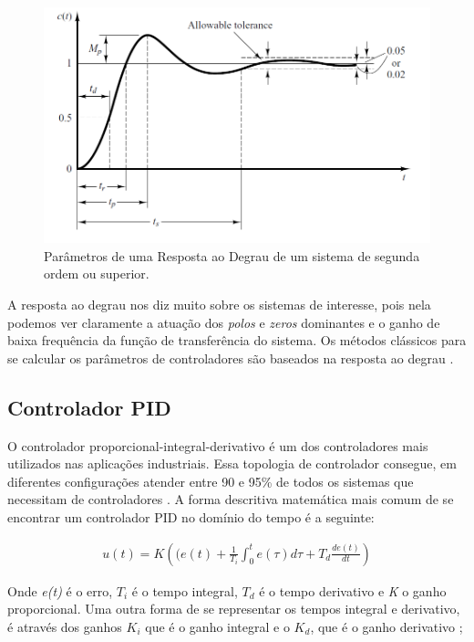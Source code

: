 \begin{figure}[!ht]
  \caption{Parâmetros de uma Resposta ao Degrau de um sistema de segunda ordem ou superior.}
  \begin{center}
      \includegraphics[scale=0.5]{img/transient_ogata_p170}
  \end{center}
  \label{fig:transient_ogata_p170}
\end{figure}

A resposta ao degrau nos diz muito sobre os sistemas de interesse, pois nela podemos ver claramente a atuação dos \textit{polos} e \textit{zeros} dominantes e o ganho de baixa frequência da função de transferência do sistema. Os métodos clássicos para se calcular os parâmetros de controladores são baseados na resposta ao degrau \cite{Ogata}. 

\subsection{Controlador PID}

O controlador proporcional-integral-derivativo é um dos controladores mais utilizados nas aplicações industriais. Essa topologia de controlador consegue, em diferentes configurações atender entre 90 e 95\% de todos os sistemas que necessitam de controladores \cite{Levine1996}. A forma descritiva matemática mais comum de se encontrar um controlador PID no domínio do tempo é a seguinte:

\begin{gather}
  u(t) = K\left((e(t)+\frac{1}{T_i}\int_{0}^{t}{e(\tau)}d\tau+T_d\frac{de(t)}{dt}\right) 
\end{gather}

Onde \textit{e(t)} é o erro, \textit{$T_i$} é o tempo integral, \textit{$T_d$} é o tempo derivativo e \textit{K} o ganho proporcional. Uma outra forma de se representar os tempos integral e derivativo, é através dos ganhos \textit{$K_i$} que é o ganho integral e o \textit{$K_d$}, que é o ganho derivativo \cite{Astrom1995};


